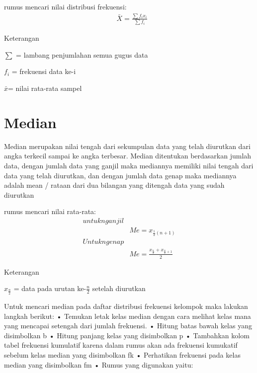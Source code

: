 \documentclass[11pt,fleqn]{book} %
\begin{document}
{\begin{theorem}[Mean]
rumus mencari nilai distribusi frekuensi:
\begin{align}
& \bar{X} = \frac{\sum f_{i}x_{i}}{\sum f_{i}} 
\end{align}
\end{theorem}

Keterangan
 
$ \sum $ = lambang penjumlahan semua gugus data

$ f_{i} $ = frekuensi data ke-i

$ \bar x $= nilai rata-rata sampel


\section{Median}

Median merupakan nilai tengah dari sekumpulan data yang telah diurutkan dari angka terkecil sampai ke angka terbesar. Median ditentukan berdasarkan jumlah data, dengan jumlah data yang ganjil maka mediannya memiliki nilai tengah dari data yang telah diurutkan, dan dengan jumlah data genap maka mediannya adalah mean / rataan dari dua bilangan yang ditengah data yang sudah diurutkan

\begin{theorem}[Median]
rumus mencari nilai rata-rata:
\begin{align}
untuk n ganjil\\
& Me =x_{\frac{1}{2}(n+1)} \\
Untuk n genap\\
& Me =\frac{x_{\frac{n}{2}}+x_{\frac{n}{2}+1}}{2}
\end{align}
\end{theorem}

Keterangan 

$x_{\frac{n}{2}}$ = data pada urutan ke-$\frac{n}{2}$ setelah diurutkan

Untuk mencari median pada daftar distribusi frekuensi kelompok maka lakukan langkah berikut:
•	Temukan letak kelas median dengan cara melihat kelas mana yang mencapai setengah dari jumlah frekuensi.
•	Hitung batas bawah kelas yang disimbolkan b
•	Hitung panjang kelas yang disimbolkan p
•	Tambahkan kolom tabel frekuensi kumulatif karena dalam rumus akan ada frekuensi kumukatif sebelum kelas median yang disimbolkan fk
•	Perhatikan frekuensi pada kelas median yang disimbolkan fm
•	Rumus yang digunakan yaitu:

}
\end{document}
